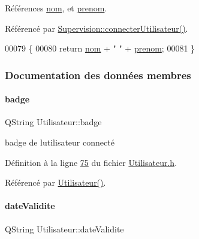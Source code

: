 Références \hyperlink{_utilisateur_8h_source_l00070}{nom}, et \hyperlink{_utilisateur_8h_source_l00071}{prenom}.



Référencé par \hyperlink{_supervision_8cpp_source_l00256}{Supervision\+::connecter\+Utilisateur()}.


\begin{DoxyCode}
00079 \{
00080     \textcolor{keywordflow}{return} \hyperlink{class_utilisateur_a1096e809aca4b7cf453a7af93cb72502}{nom} + \textcolor{stringliteral}{" "} + \hyperlink{class_utilisateur_a1dd0779807b19298f30f39d9c371170f}{prenom};
00081 \}
\end{DoxyCode}


\subsubsection{Documentation des données membres}
\mbox{\label{class_utilisateur_a77b48aa9d1f0ec04c69d45476897fec6}} 
\paragraph{\texorpdfstring{badge}{badge}}
{\footnotesize\ttfamily Q\+String Utilisateur\+::badge\hspace{0.3cm}{\ttfamily [private]}}



badge de l\textquotesingle{}utilisateur connecté 



Définition à la ligne \hyperlink{_utilisateur_8h_source_l00075}{75} du fichier \hyperlink{_utilisateur_8h_source}{Utilisateur.\+h}.



Référencé par \hyperlink{_utilisateur_8cpp_source_l00022}{Utilisateur()}.

\mbox{\label{class_utilisateur_a898cd6f5a64d733ad49a8a74388326cd}} 
\paragraph{\texorpdfstring{date\+Validite}{dateValidite}}
{\footnotesize\ttfamily Q\+String Utilisateur\+::date\+Validite\hspace{0.3cm}{\ttfamily [private]}}




